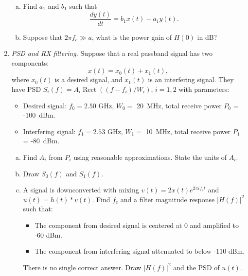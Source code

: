 \documentclass[11pt]{article}
\def\Rect{\mathop{Rect}}
\begin{document}
\begin{enumerate}
\begin{enumerate}[(a)]
\item Find $a_1$ and $b_1$ such that
\[
    \frac{dy(t)}{dt} = b_1 x(t)- a_1y(t).
\]

\item Suppose that $2\pi f_c \gg a$, what is the power gain of $H(0)$ in dB?
\end{enumerate}

\item \emph{PSD and RX filtering.}
Suppose that a real passband signal has two components:
\[
    x(t)=x_0(t)+x_1(t),
\]
where $x_0(t)$ is a desired signal, and $x_1(t)$ is an interfering signal.  They have PSD
$S_i(f)=A_i\Rect((f-f_i)/W_i)$, $i=1,2$ with parameters:
\begin{itemize}
\item Desired signal: $f_0 = 2.50$ GHz, $W_0 = $ 20~MHz, total receive power $P_0$ = -100~dBm.
\item Interfering signal: $f_1 = 2.53$ GHz, $W_1 = $ 10~MHz, total receive power $P_1$ = -80~dBm.
\end{itemize}
\begin{enumerate}[(a)]
\item Find $A_i$ from $P_i$ using reasonable approximations.  State the units of $A_i$.
\item Draw $S_0(f)$ and $S_1(f)$.
\item A signal is downconverted with mixing $v(t)=2x(t)e^{2\pi i f_ct}$ and $u(t)=h(t)*v(t)$.
Find $f_c$ and a filter magnitude response $|H(f)|^2$ such that:
\begin{itemize}
\item The component from desired signal is centered at 0 and amplified to -60 dBm.
\item The component from interfering signal attenuated to below -110 dBm.
\end{itemize}
There is no single correct answer.  Draw $|H(f)|^2$ and the PSD of $u(t)$.
\end{enumerate}


\end{enumerate}
\end{document}
